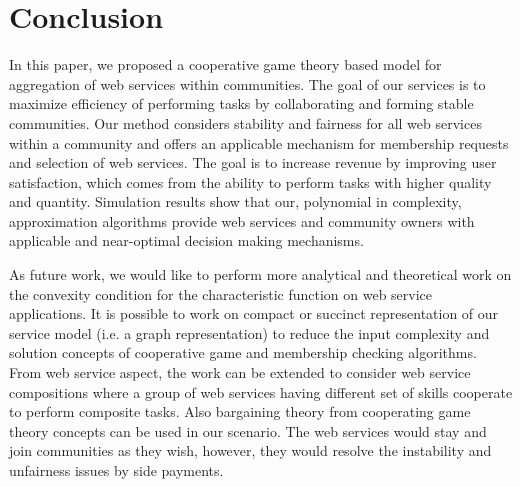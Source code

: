 \documentclass[10pt, conference, compsocconf]{IEEEtran}
\theoremstyle{plain}
\theoremstyle{definition}
\begin{document}
\section{Conclusion}\label{s:conclusion}

In this paper, we proposed a cooperative game theory based model for aggregation of web services within communities. The goal of our services is to maximize efficiency of performing tasks by collaborating and forming stable communities. Our method considers stability and fairness for all web services within a community and offers an applicable mechanism for membership requests and selection of web services. The goal is to increase revenue by improving user satisfaction, which comes from the ability to perform tasks with higher quality and quantity. Simulation results show that our, polynomial in complexity, approximation algorithms provide web services and community owners with applicable and near-optimal decision making mechanisms. 

As future work, we would like to perform more analytical and theoretical work on the convexity condition for the characteristic function on web service applications. It is possible to work on compact or succinct representation of our service model (i.e. a graph representation) to reduce the input complexity and solution concepts of cooperative game and membership checking algorithms. From web service aspect, the work can be extended to consider web service compositions where a group of web services having different set of skills cooperate to perform composite tasks. Also bargaining theory from cooperating game theory concepts can be used in our scenario. The web services would stay and join communities as they wish, however, they would resolve the instability and unfairness issues by side payments.







%
%
\end{document}
